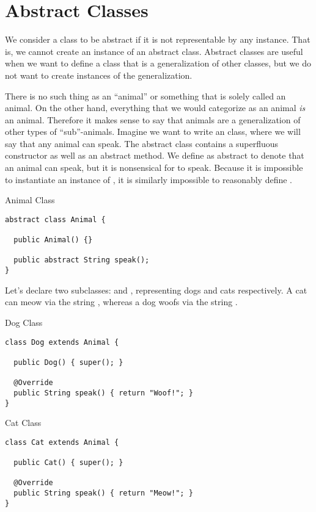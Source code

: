 \section{Abstract Classes}

We consider a class to be abstract if it is not representable by any instance. That is, we cannot create an instance of an abstract class. Abstract classes are useful when we want to define a class that is a generalization of other classes, but we do not want to create instances of the generalization.

 There is no such thing as an ``animal'' or something that is solely called an animal. On the other hand, everything that we would categorize as an animal \emph{is} an animal. Therefore it makes sense to say that animals are a generalization of other types of ``sub''-animals. Imagine we want to write an  class, where we will say that any animal can speak. The abstract class contains a superfluous constructor as well as an abstract  method. We define  as abstract to denote that an animal can speak, but it is nonsensical for  to speak. Because it is impossible to instantiate an instance of , it is similarly impossible to reasonably define .

\begin{cl}[]{Animal Class}
\begin{lstlisting}[language=MyJava]
abstract class Animal {

  public Animal() {} 

  public abstract String speak();
}
\end{lstlisting}
\end{cl}

Let's declare two subclasses:  and , representing dogs and cats respectively. A cat can meow via the string , whereas a dog woofs via the string . 

\begin{cl}[]{Dog Class}
\begin{lstlisting}[language=MyJava]
class Dog extends Animal {

  public Dog() { super(); }

  @Override
  public String speak() { return "Woof!"; }
}
\end{lstlisting}
\end{cl}

\begin{cl}[]{Cat Class}
\begin{lstlisting}[language=MyJava]
class Cat extends Animal {

  public Cat() { super(); }

  @Override
  public String speak() { return "Meow!"; }
}
\end{lstlisting}
\end{cl}

